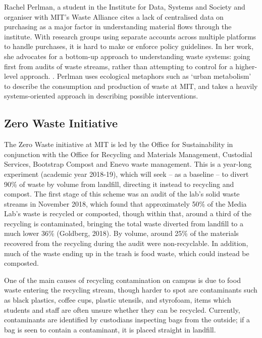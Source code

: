 \documentclass[nofonts,nols,justified,nobib]{tufte-book}
\begin{document}

Rachel Perlman, a student in the Institute for Data, Systems and Society and organiser with MIT's Waste Alliance cites a lack of centralised data on purchasing as a major factor in understanding material flows through the institute. With research groups using separate accounts across multiple platforms to handle purchases, it is hard to make or enforce policy guidelines. In her work, she advocates for a bottom-up approach to understanding waste systems: going first from audits of waste streams, rather than attempting to control for a higher-level approach. \cite{perlman_material_2016}. Perlman uses ecological metaphors such as `urban metabolism' to describe the consumption and production of waste at MIT, and takes a heavily systems-oriented approach in describing possible interventions.


\subsection*{Zero Waste Initiative}

The Zero Waste initiative at MIT is led by the Office for Sustainability in conjunction with the Office for Recycling and Materials Management, Custodial Services, Bootstrap Compost and Enevo waste management. This is a year-long experiment (academic year 2018-19), which will seek -- as a baseline -- to divert 90\% of waste by volume from landfill, directing it instead to recycling and compost. The first stage of this scheme was an audit of the lab's solid waste streams in November 2018, which found that approximately 50\% of the Media Lab's waste is recycled or composted, though within that, around a third of the recycling is contaminated, bringing the total waste diverted from landfill to a much lower 36\% (Goldberg, 2018). By volume, around 25\% of the materials recovered from the recycling during the audit were non-recyclable. In addition, much of the waste ending up in the trash is food waste, which could instead be composted.

One of the main causes of recycling contamination on campus is due to food waste entering the recycling stream, though harder to spot are contaminants such as black plastics, coffee cups, plastic utensils, and styrofoam, items which students and staff are often unsure whether they can be recycled. Currently, contaminants are identified by custodians inspecting bags from the outside; if a bag is seen to contain a contaminant, it is placed straight in landfill.
\end{document}
